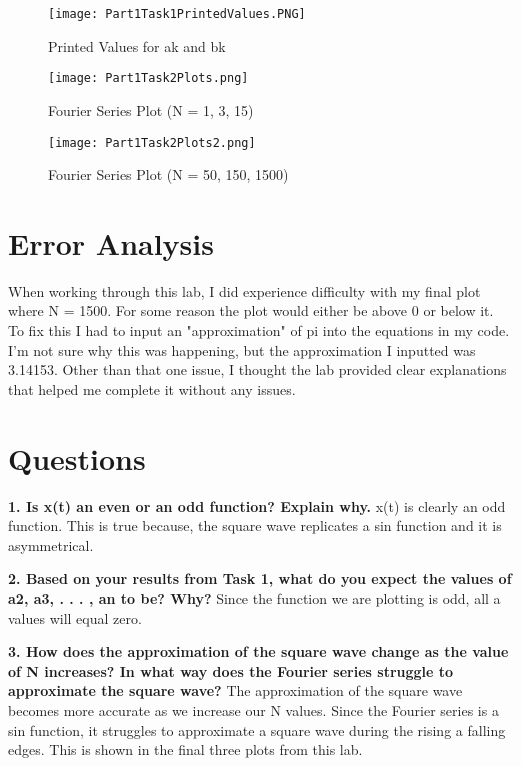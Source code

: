 \documentclass[12pt]{report}
\begin{document}
\begin{figure}

\texttt{[image: Part1Task1PrintedValues.PNG]}
\caption{Printed Values for ak and bk}
\end{figure}

\begin{figure}
\texttt{[image: Part1Task2Plots.png]}
\caption{Fourier Series Plot (N = 1, 3, 15) }
\end{figure}

\begin{figure}
\texttt{[image: Part1Task2Plots2.png]}
\caption{Fourier Series Plot (N = 50, 150, 1500)}
\end{figure}

\newpage

\section{Error Analysis}

When working through this lab, I did experience difficulty with my final plot where N = 1500. For some reason the plot would either be above 0 or below it. To fix this I had to input an "approximation" of pi into the equations in my code. I'm not sure why this was happening, but the approximation I inputted was 3.14153. Other than that one issue, I thought the lab provided clear explanations that helped me complete it without any issues. 



\section{Questions}

\textbf{1. Is x(t) an even or an odd function? Explain why.}
{x(t) is clearly an odd function. This is true because, the square wave replicates a sin function and it is asymmetrical. }

\textbf{2. Based on your results from Task 1, what do you expect the values of a2, a3, . . . , an to be? Why?}
{Since the function we are plotting is odd, all a values will equal zero. }

\textbf{3.  How does the approximation of the square wave change as the value of N increases? In what way does the Fourier series struggle to approximate the square wave?}
{The approximation of the square wave becomes more accurate as we increase our N values. Since the Fourier series is a sin function, it struggles to approximate a square wave during the rising a falling edges. This is shown in the final three plots from this lab. }
\end{document}
